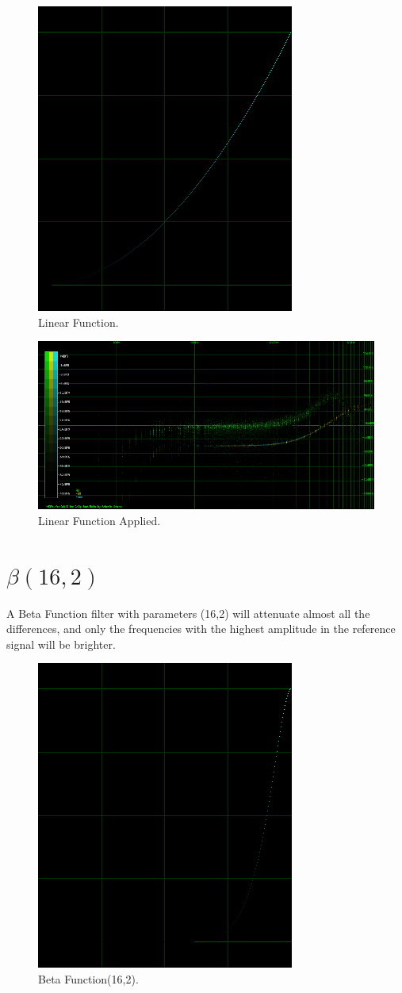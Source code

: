 \documentclass[10pt,a4paper]{report}
\begin{document}
\begin{appendices}
\begin{figure}[H]
	\centering
	\includegraphics[width=0.4\linewidth]{images/colorfilter/BetaFunctionPlot_4.png}
	\caption[Linear]{Linear Function.}
	\label{fig:betafunctionplot4}
\end{figure}

\begin{figure}[H]
	\centering
	\includegraphics[width=1\linewidth]{images/colorfilter/BetaFunctionPlot_4_Data.png}
	\caption[Linear Applied]{Linear Function Applied.}
	\label{fig:betafunctionplot4data}
\end{figure}

\section{$\beta(16,2)$} 

A Beta Function filter with parameters (16,2) will attenuate almost all the differences, and only the frequencies with the highest amplitude in the reference signal will be brighter.

\begin{figure}[H]
	\centering
	\includegraphics[width=0.4\linewidth]{images/colorfilter/BetaFunctionPlot_5.png}
	\caption[Beta Function(16,2)]{Beta Function(16,2).}
	\label{fig:betafunctionplot5}
\end{figure}


\end{appendices}
\end{document}
